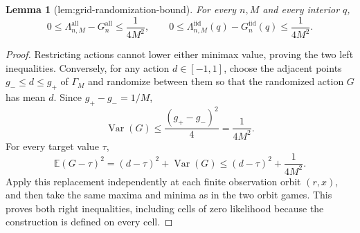 \documentclass{article}
\newtheorem{lemma}{Lemma}
\begin{document}
\begin{lemma}[lem:grid-randomization-bound]\label{lem:grid-randomization-bound}
For every \(n,M\) and every interior \(q\),
\[
0\leq\Lambda_{n,M}^{\mathrm{all}}-G_n^{\mathrm{all}}
\leq\frac1{4M^2},
\qquad
0\leq\Lambda_{n,M}^{\mathrm{iid}}(q)-G_n^{\mathrm{iid}}(q)
\leq\frac1{4M^2}.
\]
\end{lemma}
\begin{proof}
Restricting actions cannot lower either minimax value, proving the two left inequalities.  Conversely, for any action \(d\in[-1,1]\), choose the adjacent points \(g_-\leq d\leq g_+\) of \(\Gamma_M\) and randomize between them so that the randomized action \(G\) has mean \(d\).  Since \(g_+-g_-=1/M\),
\[
\operatorname{Var}(G)\leq\frac{(g_+-g_-)^2}{4}
=\frac1{4M^2}.
\]
For every target value \(\tau\),
\[
\mathbb E(G-\tau)^2=(d-\tau)^2+\operatorname{Var}(G)
\leq(d-\tau)^2+\frac1{4M^2}.
\]
Apply this replacement independently at each finite observation orbit \((r,x)\), and then take the same maxima and minima as in the two orbit games.  This proves both right inequalities, including cells of zero likelihood because the construction is defined on every cell.
\end{proof}
\end{document}
